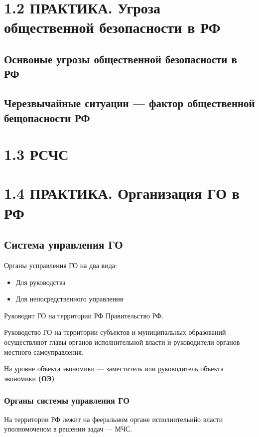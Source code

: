 \documentclass[oneside,final,14pt]{extreport}
\begin{document}
\chapter*{1.2 ПРАКТИКА. Угроза общественной безопасности в РФ}

\section*{Оснвоные угрозы общественной безопасности в РФ}

\section*{Черезвычайные ситуации --- фактор общественной бещопасности РФ}

\chapter*{1.3 РСЧС}


\chapter*{1.4 ПРАКТИКА. Организация ГО в РФ}

\section*{Система управления ГО}

Органы усправления ГО на два вида:
\begin{itemize}
	\item Для руководства
	\item Для непосредственного управления
\end{itemize}

Руководит ГО на территории РФ Правительство РФ.

Руководство ГО на территории субъектов и муниципальных образований осуществляют главы органов исполнительной власти и руководители органов местного самоуправления.

На уровне объекта экономики --- заместитель или руководитель объекта экономики \textbf{(ОЭ)}

\subsection*{Органы системы управления ГО}

На территории РФ лежит на фееральном органе исполнительнйо власти уполномоченом в решении задач  --- МЧС.
\end{document}
